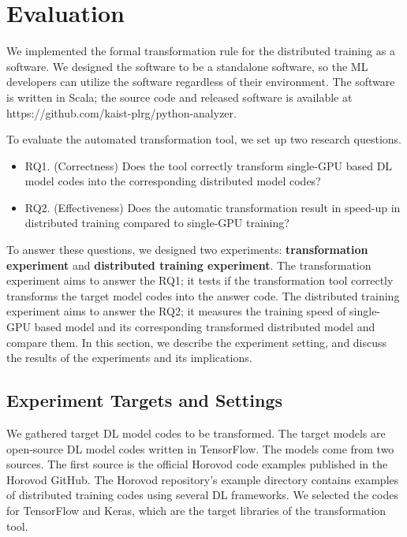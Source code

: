\section{Evaluation}\label{sec:eval}

We implemented the formal transformation rule for the distributed training
as a software. We designed the software to be a standalone software, so 
the ML developers can utilize the software regardless of their environment. 
The software is written in Scala; the source code and released software
is available at https://github.com/kaist-plrg/python-analyzer.

To evaluate the automated transformation tool, we set up two research
questions.

\begin{itemize}
\item RQ1. (Correctness) Does the tool correctly transform single-GPU based DL model codes into
the corresponding distributed model codes?

\item RQ2. (Effectiveness) Does the automatic transformation result in speed-up 
in distributed training compared to single-GPU training?
\end{itemize}

To answer these questions,  
we designed two experiments: \textbf{transformation experiment} and
\textbf{distributed training experiment}.
The transformation experiment aims to answer the RQ1; it tests if the
transformation tool correctly transforms the target model codes into
the answer code.
The distributed training experiment aims to answer the RQ2;
it measures the training speed of single-GPU based model and its
corresponding transformed distributed model and compare them.
In this section, we describe the experiment setting,
and discuss the results of the experiments and its implications.

\subsection{Experiment Targets and Settings}

We gathered target DL model codes to be transformed.
The target models are open-source DL model codes written in TensorFlow.
The models come from two sources. The first source is the official
Horovod code examples published in the Horovod GitHub\cite{horovodgithub}. 
The Horovod repository's example directory contains examples of
distributed training codes using several DL frameworks.  
We selected the codes for TensorFlow and Keras,
which are the target libraries of the transformation tool.

